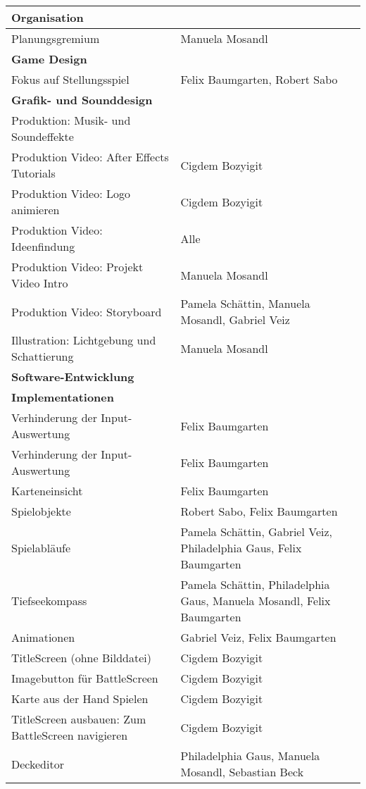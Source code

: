 \begin{tabular}{|p{8cm}|p{10cm}|}
\hline
\textbf{Organisation} &  \\ \hline
Planungsgremium & Manuela Mosandl \\ \hline
\textbf{Game Design} &  \\ \hline
Fokus auf Stellungsspiel & Felix Baumgarten, Robert Sabo \\ \hline
\textbf{Grafik- und Sounddesign} & \\ \hline
Produktion: Musik- und Soundeffekte & \\ \hline
Produktion Video: After Effects Tutorials & Cigdem Bozyigit \\ \hline
Produktion Video: Logo animieren & Cigdem Bozyigit \\ \hline
Produktion Video: Ideenfindung & Alle \\ \hline
Produktion Video: Projekt Video Intro & Manuela Mosandl \\ \hline
Produktion Video: Storyboard & Pamela Schättin, Manuela Mosandl, Gabriel Veiz \\ \hline
Illustration: Lichtgebung und Schattierung & Manuela Mosandl \\ \hline
\textbf{Software-Entwicklung} & \\ \hline
\textbf{Implementationen} & \\ \hline
Verhinderung der Input-Auswertung & Felix Baumgarten \\ \hline
Verhinderung der Input-Auswertung & Felix Baumgarten \\ \hline
Karteneinsicht & Felix Baumgarten \\ \hline
Spielobjekte & Robert Sabo, Felix Baumgarten \\ \hline
Spielabläufe & Pamela Schättin, Gabriel Veiz, Philadelphia Gaus, Felix Baumgarten \\ \hline
Tiefseekompass & Pamela Schättin, Philadelphia Gaus, Manuela Mosandl, Felix Baumgarten \\ \hline
Animationen & Gabriel Veiz, Felix Baumgarten \\ \hline
TitleScreen (ohne Bilddatei) & Cigdem Bozyigit \\ \hline
Imagebutton für BattleScreen & Cigdem Bozyigit \\ \hline
Karte aus der Hand Spielen & Cigdem Bozyigit \\ \hline
TitleScreen ausbauen: Zum BattleScreen navigieren & Cigdem Bozyigit \\ \hline
Deckeditor & Philadelphia Gaus, Manuela Mosandl, Sebastian Beck \\ \hline

\end{tabular}
